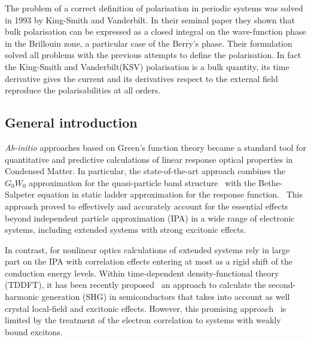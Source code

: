 The problem of a correct definition of polarisation in periodic systems was solved in 1993 by  King-Smith and Vanderbilt.\cite{KSV1} In their seminal paper they shown that  bulk polarisation can be expressed as a closed integral on the wave-function phase in the Brillouin zone, a particular case of the Berry's phase. Their formulation solved all problems with the previous attempts to define the polarisation. In fact the King-Smith and Vanderbilt(KSV) polarisation is a bulk quantity, its time derivative gives the current and its derivatives respect to the external field reproduce the polarisabilities at all orders.\\
\subsection{General introduction}
\emph{Ab-initio} approaches based on Green's function theory became a standard tool for quantitative and predictive calculations of linear response optical properties in Condensed Matter. In particular, the state-of-the-art approach combines the $G_0W_0$ approximation for the quasi-particle band structure~\cite{aryasetiawan1998gw} with the Bethe-Salpeter equation in static ladder approximation for the response function.~\cite{strinati} This approach proved to effectively and accurately account for the essential effects beyond independent particle approximation (IPA) in a wide range of electronic systems, including extended systems with strong excitonic effects.~\cite{Onida}

In contrast, for nonlinear optics \ai calculations of extended systems rely in large part on the IPA\cite{PhysRevB.48.11705} with correlation effects entering at most as a rigid shift of the conduction energy levels\cite{PhysRevB.80.155205}.  Within time-dependent density-functional theory (TDDFT), it has been recently proposed~\cite{PhysRevB.82.235201} an approach to calculate the second-harmonic generation (SHG) in semiconductors that takes into account as well crystal local-field and excitonic effects. However, this promising approach~\cite{Cazzanelli2012} is limited by the treatment of the electron correlation to systems with weakly bound excitons.~\cite{LRC} 

